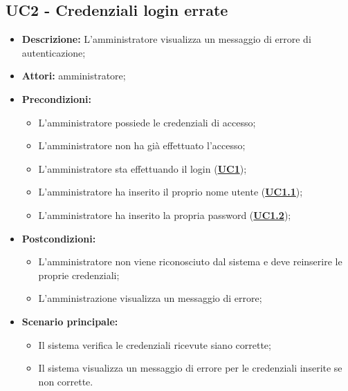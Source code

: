 \subsection{UC2 - Credenziali login errate}
\label{sec:UC2}
\begin{itemize}
	\item \textbf{Descrizione:} L’amministratore visualizza un messaggio di errore di autenticazione;
	\item \textbf{Attori:} amministratore;
	\item \textbf{Precondizioni:} 
	\begin{itemize}
		\item L’amministratore possiede le credenziali di accesso;
		\item L’amministratore non ha già effettuato l’accesso;
		\item L’amministratore sta effettuando il login (\hyperref[sec:UC1]{\textbf{UC1}});
		\item L’amministratore ha inserito il proprio nome utente (\hyperref[sec:UC1.1]{\textbf{UC1.1}});
		\item L’amministratore ha inserito la propria password (\hyperref[sec:UC1.2]{\textbf{UC1.2}});
	\end{itemize}
	\item \textbf{Postcondizioni:}
	\begin{itemize}
		\item L’amministratore non viene riconosciuto dal sistema e deve reinserire le proprie credenziali;
		\item L'amministrazione visualizza un messaggio di errore;
	\end{itemize}
	\item \textbf{Scenario principale:} 
	\begin{itemize}
		\item Il sistema verifica le credenziali ricevute siano corrette;
		\item Il sistema visualizza un messaggio di errore per le credenziali inserite se non corrette.
	\end{itemize}
\end{itemize}

